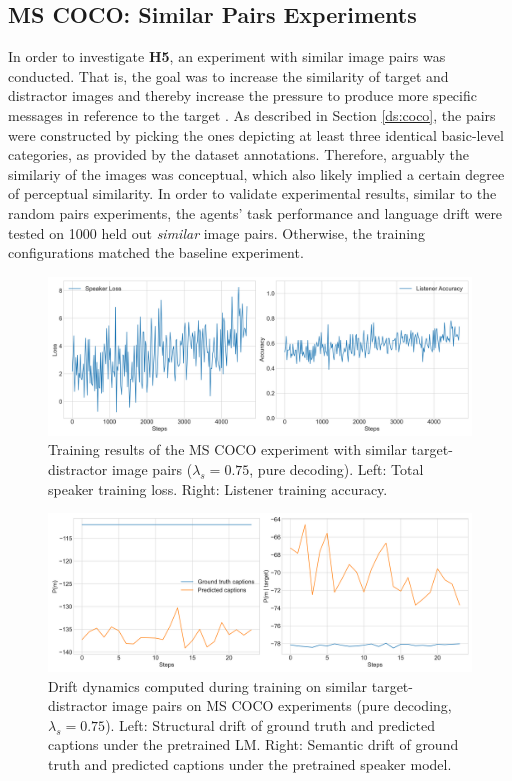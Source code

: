 \subsection{MS COCO: Similar Pairs Experiments}
\label{expt:coco_similar_pairs}
In order to investigate \textbf{H5}, an experiment with similar image pairs was conducted. That is, the goal was to increase the similarity of target and distractor images and thereby increase the pressure to produce more specific messages in reference to the target \parencite[cf.][]{graf2016animal}. As described in Section \ref{ds:coco}, the pairs were constructed by picking the ones depicting at least three identical basic-level categories, as provided by the dataset annotations. Therefore, arguably the similariy of the images was conceptual, which also likely implied a certain degree of perceptual similarity. In order to validate experimental results, similar to the random pairs experiments, the agents' task performance and language drift were tested on 1000 held out \emph{similar} image pairs. 
Otherwise, the training configurations matched the baseline experiment. 

\begin{figure}[h]
	\centering
	\includegraphics[width=\linewidth]{images/coco_similarFixed_075_losses.png}
	\caption{Training results of the MS COCO experiment with similar target-distractor image pairs ($\lambda_s=0.75$, pure decoding). Left: Total speaker training loss. Right: Listener training accuracy.}
	\label{fig:coco_similar_speaker_loss_listener_acc_all}
\end{figure}

\begin{figure}[h]
	\centering
	\includegraphics[width=\linewidth]{images/coco_structural_semantic_drift_4000_pure_075_similarFixed.png}
	\caption{Drift dynamics computed during training on similar target-distractor image pairs on MS COCO experiments (pure decoding, $\lambda_s=0.75$). Left: Structural drift of ground truth and predicted captions under the pretrained LM. Right: Semantic drift of ground truth and predicted captions under the pretrained speaker model.}
	\label{fig:coco_similar_str_sem_drift_all}
\end{figure}

